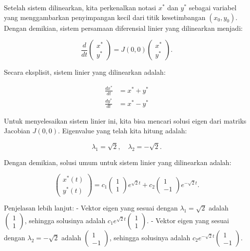 \documentclass{article}
\begin{document}
Setelah sistem dilinearkan, kita perkenalkan notasi \( x^* \) dan \( y^* \) sebagai variabel yang menggambarkan penyimpangan kecil dari titik kesetimbangan \( (x_0, y_0) \). Dengan demikian, sistem persamaan diferensial linier yang dilinearkan menjadi:

\[
\frac{d}{dt} \begin{pmatrix} x^* \\ y^* \end{pmatrix} = J(0, 0) \begin{pmatrix} x^* \\ y^* \end{pmatrix}.
\]

Secara eksplisit, sistem linier yang dilinearkan adalah:

\[
\begin{aligned}
\frac{dx^*}{dt} &= x^* + y^* \\
\frac{dy^*}{dt} &= x^* - y^*
\end{aligned}
\]

Untuk menyelesaikan sistem linier ini, kita bisa mencari solusi eigen dari matriks Jacobian \( J(0, 0) \). Eigenvalue yang telah kita hitung adalah:

\[
\lambda_1 = \sqrt{2}, \quad \lambda_2 = -\sqrt{2}.
\]

Dengan demikian, solusi umum untuk sistem linier yang dilinearkan adalah:

\[
\begin{pmatrix} x^*(t) \\ y^*(t) \end{pmatrix} = c_1 \begin{pmatrix} 1 \\ 1 \end{pmatrix} e^{\sqrt{2} t} + c_2 \begin{pmatrix} 1 \\ -1 \end{pmatrix} e^{-\sqrt{2} t}.
\]

Penjelasan lebih lanjut:
- Vektor eigen yang sesuai dengan \( \lambda_1 = \sqrt{2} \) adalah \( \begin{pmatrix} 1 \\ 1 \end{pmatrix} \), sehingga solusinya adalah \( c_1 e^{\sqrt{2} t} \begin{pmatrix} 1 \\ 1 \end{pmatrix} \).
- Vektor eigen yang sesuai dengan \( \lambda_2 = -\sqrt{2} \) adalah \( \begin{pmatrix} 1 \\ -1 \end{pmatrix} \), sehingga solusinya adalah \( c_2 e^{-\sqrt{2} t} \begin{pmatrix} 1 \\ -1 \end{pmatrix} \).
\end{document}
